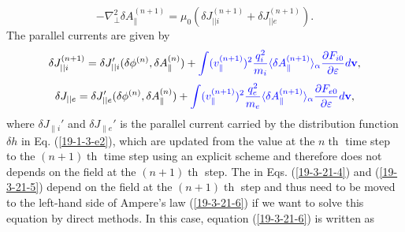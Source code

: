 \documentclass{llncs}
\newcommand{\tmcolor}[2]{{\color{#1}{#2}}}
\newcommand{\tmop}[1]{\ensuremath{\operatorname{#1}}}
\begin{document}
\begin{equation}
  \label{19-3-21-6} - \nabla^2_{\perp} \delta A_{\parallel}^{(n + 1)} = \mu_0 
  (\delta J_{||i}^{(n + 1)} + \delta J_{||e}^{(n + 1)}) .
\end{equation}
The parallel currents are given by
\begin{equation}
  \label{19-3-21-4} \delta J_{|| i}^{(n + 1)} = \delta J_{|| i}' (\delta
  \phi^{(n)}, \delta A_{\parallel}^{(n)}) + \tmcolor{blue}{\int
  (v_{\parallel}^{(n + 1)})^2 \frac{q^2_i}{m_i} \langle \delta
  A_{\parallel}^{(n + 1)} \rangle_{\alpha} \frac{\partial F_{i 0}}{\partial
  \varepsilon} d\mathbf{v}},
\end{equation}
\begin{equation}
  \label{19-3-21-5} \delta J_{|| e} = \delta J_{|| e}' (\delta \phi^{(n)},
  \delta A_{\parallel}^{(n)}) + \tmcolor{blue}{\int (v_{\parallel}^{(n +
  1)})^2 \frac{q^2_e}{m_e} \langle \delta A_{\parallel}^{(n + 1)}
  \rangle_{\alpha} \frac{\partial F_{e 0}}{\partial \varepsilon} d\mathbf{v}},
\end{equation}
where $\delta J_{\parallel i}'$ and $\delta J_{\parallel e}'$ is the parallel
current carried by the distribution function $\delta h$ in Eq.
(\ref{19-1-3-e2}), which are updated from the value at the $n \tmop{th}$ time
step to the $(n + 1) \tmop{th}$ time step using an explicit scheme and
therefore does not depends on the field at the $(n + 1) \tmop{th}$ step.
The\tmcolor{blue}{ blue terms} in Eqs. (\ref{19-3-21-4}) and (\ref{19-3-21-5})
depend on the field at the $(n + 1) \tmop{th}$ step and thus need to be moved
to the left-hand side of Ampere's law (\ref{19-3-21-6}) if we want to solve
this equation by direct methods. In this case, equation (\ref{19-3-21-6}) is
written as
\end{document}
